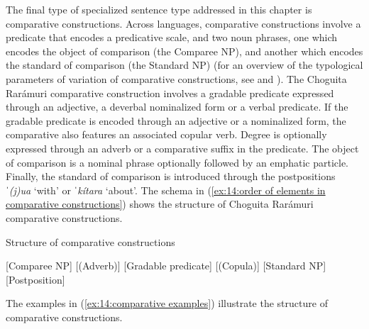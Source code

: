 The final type of specialized sentence type addressed in this chapter is comparative constructions. Across languages, comparative constructions involve a predicate that encodes a predicative scale, and two noun phrases, one which encodes the object of comparison (the Comparee NP), and another which encodes the standard of comparison (the Standard NP) (for an overview of the typological parameters of variation of comparative constructions, see \citealt{stassen1985comparison} and \citealt{haspelmath2017equative}). The Choguita Rarámuri comparative construction involves a gradable predicate expressed through an adjective, a deverbal nominalized form or a verbal predicate. If the gradable predicate is encoded through an adjective or a nominalized form, the comparative also features an associated copular verb. Degree is optionally expressed through an adverb or a comparative suffix in the predicate. The object of comparison is a nominal phrase optionally followed by an emphatic particle. Finally, the standard of comparison is introduced through the postpositions \textit{ˈ(j)ua} ‘with’ or \textit{ˈkítara} ‘about’. The schema in (\ref{ex:14:order of elements in comparative constructions}) shows the structure of Choguita Rarámuri comparative constructions.

\ea\label{ex:14:order of elements in comparative constructions}
{Structure of comparative constructions}

[Comparee NP] [(Adverb)] [Gradable predicate] [(Copula)] [Standard NP] [Postposition] \\

\z

The examples in (\ref{ex:14:comparative examples}) illustrate the structure of comparative constructions.

\ea\label{ex:14:comparative examples}

